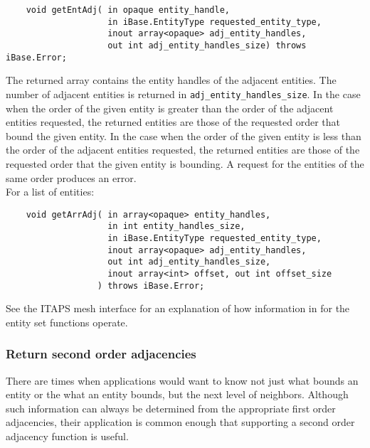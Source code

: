 \documentclass{article}
\begin{document}
\begin{verbatim}
    void getEntAdj( in opaque entity_handle, 
                    in iBase.EntityType requested_entity_type, 
                    inout array<opaque> adj_entity_handles, 
                    out int adj_entity_handles_size) throws iBase.Error;
\end{verbatim}
The returned array contains the entity handles of the adjacent 
entities. The number of adjacent entities is returned in {\tt adj\_entity\_handles\_size}. In the case when the 
order of the given entity is greater than the order of the adjacent 
entities requested, the returned entities are those of the requested 
order that bound the given entity. In the case when the order 
of the given entity is less than the order of the adjacent entities 
requested, the returned entities are those of the requested order 
that the given entity is bounding. A request for the entities 
of the same order produces an error. \\

\hspace{-16pt}For a list of entities:

\begin{verbatim}
    void getArrAdj( in array<opaque> entity_handles, 
                    in int entity_handles_size,
                    in iBase.EntityType requested_entity_type, 
                    inout array<opaque> adj_entity_handles, 
                    out int adj_entity_handles_size, 
                    inout array<int> offset, out int offset_size
                  ) throws iBase.Error;
\end{verbatim}

\hspace{-16pt}See the ITAPS mesh interface  \cite{r26} for an explanation of how 
information in for the entity set functions operate.

\subsubsection{Return second order adjacencies }
There are times when applications would want to know not 
just what bounds an entity or the what an entity bounds, but 
the next level of neighbors. Although such information can always 
be determined from the appropriate first order adjacencies, their 
application is common enough that supporting a second order adjacency 
function is useful.\\
\end{document}
